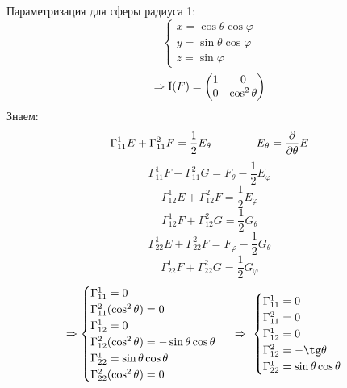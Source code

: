 \documentclass[main]{subfiles}
\begin{document}
    \begin{sol}
        Параметризация для сферы радиуса 1:
        \[\begin{cases}
          x = \cos\theta \cos\varphi\\
          y = \sin\theta \cos\varphi\\
          z =\sin\varphi
        \end{cases}\]
        \[\Ra \RNumb{1}(F)=\begin{pmatrix}
          1 & 0\\
          0 & \cos^2 \theta
        \end{pmatrix}\]
        Знаем:
        \[\Gamma^1_{11} E + \Gamma_{11}^2 F = \frac{1}{2}E_{\theta}  \qquad\qquad E_{\theta} = \frac{\partial }{\partial \theta} E \]
        \[\Gamma^1_{11} F + \Gamma_{11}^2 G = F_{\theta} - \frac{1}{2}E_{\varphi}  \]
        \[\Gamma^1_{12} E + \Gamma_{12}^2 F = \frac{1}{2} E_{\varphi}  \]
        \[\Gamma_{12}^1 F + \Gamma_{12}^2 G = \frac{1}{2} G_{\theta} \]
        \[\Gamma_{22}^1 E + \Gamma_{22}^2 F = F_{\varphi} - \frac{1}{2}G_{\theta}  \]
        \[\Gamma_{22}^1 F + \Gamma_{22}^2 G = \frac{1}{2} G_{\varphi}  \]
        \[\Ra \begin{cases}
            \Gamma^1_{11} = 0\\
            \Gamma_{11}^2 (\cos^2 \theta) = 0\\
            \Gamma^1_{12} = 0\\
            \Gamma_{12}^2 (\cos^2 \theta)  = - \sin \theta \cos \theta\\
            \Gamma_{22}^1 = \sin \theta \cos \theta\\
            \Gamma_{22}^2 (\cos^2 \theta) = 0
        \end{cases} \RA
        \begin{cases}
            \Gamma^1_{11} = 0\\
            \Gamma_{11}^2 = 0\\
            \Gamma^1_{12} = 0\\
            \Gamma_{12}^2 = - \tg \theta\\
            \Gamma_{22}^1 = \sin \theta \cos \theta\\

\end{cases}\]
\end{sol}
\end{document}
